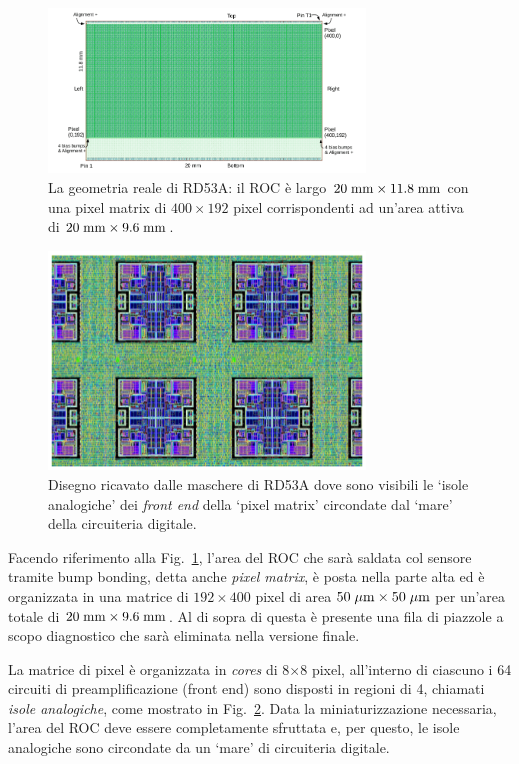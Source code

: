 \begin{figure}
\centering
\includegraphics[width=0.75\textwidth]{Immagini/RD53ALayout}
\caption{La geometria reale di RD53A: il ROC è largo $20\rm \; mm \times 11.8\rm \; mm$ con una pixel matrix di $400\times 192$ pixel corrispondenti ad un'area attiva di $20\rm \; mm \times 9.6\rm \; mm$.}
\label{RD53ALayout}
\end{figure}
\begin{figure}
\centering
\includegraphics[width=0.75\textwidth]{Immagini/AnalogIsland}
\caption{Disegno ricavato dalle maschere di RD53A dove sono visibili le `isole analogiche' dei \textit{front end} della `pixel matrix' circondate dal `mare' della circuiteria digitale.}
\label{AnalogIsland}
\end{figure} 
Facendo riferimento alla Fig.~\ref{RD53ALayout}, l'area del ROC che sarà saldata col sensore tramite bump bonding, detta anche {\em pixel matrix}, è posta nella parte alta ed è organizzata in una matrice di $192\times400$ pixel di area $50\; \mu \rm m \times 50 \; \mu \rm m$ per un'area totale di $20\rm \; mm \times 9.6\rm \; mm$.
Al di sopra di questa è presente una fila di piazzole a scopo diagnostico che sarà eliminata nella versione finale.

La matrice di pixel è organizzata in \textit{cores} di 8$\times$8 pixel, all'interno di ciascuno i 64 circuiti di preamplificazione (front end) sono disposti in regioni di 4, chiamati {\em isole analogiche}, come mostrato in Fig.~\ref{AnalogIsland}. 
Data la miniaturizzazione necessaria, l'area del ROC deve essere completamente sfruttata e, per questo, le isole analogiche sono circondate da un `mare' di circuiteria digitale. 


